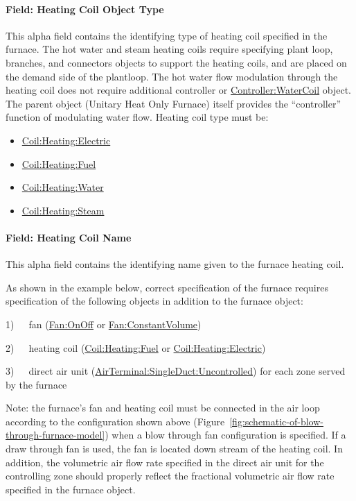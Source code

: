 \paragraph{Field: Heating Coil Object Type}\label{field-heating-coil-object-type-5}

This alpha field contains the identifying type of heating coil specified in the furnace. The hot water and steam heating coils require specifying plant loop, branches, and connectors objects to support the heating coils, and are placed on the demand side of the plantloop. The hot water flow modulation through the heating coil does not require additional controller or \hyperref[controllerwatercoil]{Controller:WaterCoil} object. The parent object (Unitary Heat Only Furnace) itself provides the ``controller'' function of modulating water flow. Heating coil type must be:

\begin{itemize}
\item
  \hyperref[coilheatingelectric]{Coil:Heating:Electric}
\item
  \hyperref[coilheatinggas-000]{Coil:Heating:Fuel}
\item
  \hyperref[coilheatingwater]{Coil:Heating:Water}
\item
  \hyperref[coilheatingsteam]{Coil:Heating:Steam}
\end{itemize}

\paragraph{Field: Heating Coil Name}\label{field-heating-coil-name-5}

This alpha field contains the identifying name given to the furnace heating coil.

As shown in the example below, correct specification of the furnace requires specification of the following objects in addition to the furnace object:

1)~~~fan (\hyperref[fanonoff]{Fan:OnOff} or \hyperref[fanconstantvolume]{Fan:ConstantVolume})

2)~~~heating coil (\hyperref[coilheatinggas-000]{Coil:Heating:Fuel} or \hyperref[coilheatingelectric]{Coil:Heating:Electric})

3)~~~direct air unit (\hyperref[airterminalsingleductuncontrolled]{AirTerminal:SingleDuct:Uncontrolled}) for each zone served by the furnace

Note: the furnace's fan and heating coil must be connected in the air loop according to the configuration shown above (Figure~\ref{fig:schematic-of-blow-through-furnace-model}) when a blow through fan configuration is specified. If a draw through fan is used, the fan is located down stream of the heating coil. In addition, the volumetric air flow rate specified in the direct air unit for the controlling zone should properly reflect the fractional volumetric air flow rate specified in the furnace object.

